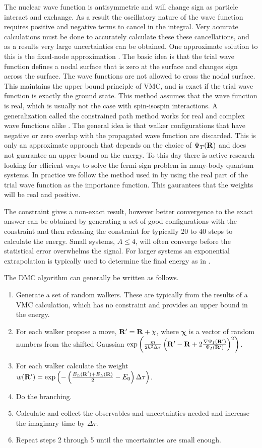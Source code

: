 The nuclear wave function is antisymmetric and will change sign as particle interact and exchange. As a result the oscillatory nature of the wave function requires positive and negative terms to cancel in the integral. Very accurate calculations must be done to accurately calculate these these cancellations, and as a results very large uncertainties can be obtained. One approximate solution to this is the fixed-node approximation \cite{moskowitz1982}. The basic idea is that the trial wave function defines a nodal surface that is zero at the surface and changes sign across the surface. The wave functions are not allowed to cross the nodal surface. This maintains the upper bound principle of VMC, and is exact if the trial wave function is exactly the ground state. This method assumes that the wave function is real, which is usually not the case with spin-isospin interactions. A generalization called the constrained path method works for real and complex wave functions alike \cite{wiringa2000}. The general idea is that walker configurations that have negative or zero overlap with the propagated wave function are discarded. This is only an approximate approach that depends on the choice of $\Psi_T(\mathbf{R})$ and does not guarantee an upper bound on the energy. To this day there is active research looking for efficient ways to solve the fermi-sign problem in many-body quantum systems. In practice we follow the method used in \cite{zhang2003} by using the real part of the trial wave function as the importance function. This gaurantees that the weights will be real and positive.

The constraint gives a non-exact result, however better convergence to the exact answer can be obtained by generating a set of good configurations with the constraint and then releasing the constraint for typically 20 to 40 steps to calculate the energy. Small systems, $A\le4$, will often converge before the statistical error overwhelms the signal. For larger systems an exponential extrapolation is typically used to determine the final energy as in \cite{pudliner1997}.

The DMC algorithm can generally be written as follows.
\begin{enumerate}
   \item Generate a set of random walkers. These are typically from the results of a VMC calculation, which has no constraint and provides an upper bound in the energy.
   \item For each walker propose a move, $\mathbf{R}' = \mathbf{R} + \mathbf{\chi}$, where $\mathbf{\chi}$ is a vector of random numbers from the shifted Gaussian $\exp\left(\frac{m}{2\hbar^2\Delta\tau}\left(\mathbf{R}'-\mathbf{R}+2\frac{\nabla\Psi_I(\mathbf{R}')}{\Psi_I(\mathbf{R}')}\right)^2\right)$.
   \item For each walker calculate the weight $w(\mathbf{R}')=\exp\left(-\left(\frac{E_L(\mathbf{R}')+E_L(\mathbf{R})}{2}-E_0\right)\Delta\tau\right)$.
   \item Do the branching.
   \item Calculate and collect the observables and uncertainties needed and increase the imaginary time by $\Delta\tau$.
   \item Repeat steps 2 through 5 until the uncertainties are small enough.
\end{enumerate}


